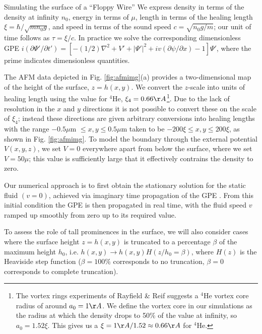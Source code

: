 \begin{chapter}{\label{cha:afm}Simulating the surface of a ``Floppy Wire''}
We express density in terms of the density at infinity $n_0$, energy in terms of $\mu$, length in terms of the healing length $\xi=\hbar/\sqrt{m n_0 g}$, and speed in terms of the sound speed $c=\sqrt{n_0 g/m}$; our unit of time follows as $\tau=\xi/c$.  In practice we solve the corresponding dimensionless GPE $i(\partial\Psi'/\partial t') = \left[-(1/2)\nabla^2 + V' + |\Psi'|^2 + iv (\partial \psi/\partial x)- 1 \right] \Psi'$, where the prime indicates dimensionless quantities.

The AFM data depicted in Fig. \ref{fig:afmimg}(a) provides a two-dimensional map of the height of the surface, $z=h(x,y)$.  We convert the $z$-scale into units of healing length using the value for $^{4}$He, $\xi_{4}=0.66 \AA$\footnote{The vortex rings experiments of Rayfield \& Reif \cite{Rayfield1964} 
suggests a $^4$He vortex core radius of around $a_0=1\AA$. We define the vortex 
core in our simulations as the radius at which the density drops to 
50\% of the value at infinity, so $a_0 = 1.52\xi$. This gives us a
$\xi=1\AA/1.52 \approx 0.66\AA$ for $^4$He.}.  Due to the lack of resolution in the $x$ and $y$ directions it is not possible to convert these on the scale of $\xi_{4}$; instead these directions are given arbitrary conversions into healing lengths with the range $-0.5 \mu$m $\leq x,y \leq 0.5 \mu$m taken to be $-200 \xi \leq x,y \leq 200 \xi$, as shown in Fig. \ref{fig:afmimg}.
To model the boundary through the external potential $V(x,y,z)$, we set $V=0$ everywhere apart from below the surface, where we set $V=50 \mu$; this value is sufficiently large that it effectively contrains the density to zero.  

Our numerical approach is to first obtain the stationary solution for the static fluid $(v=0)$, achieved via imaginary time propagation of the GPE \cite{Minguzzi2004}.  From this initial condition the GPE is then propagated in real time, with the fluid speed $v$ ramped up smoothly from zero up to its required value.  

To assess the role of tall prominences in the surface, we will also consider cases where the surface height $z=h(x,y)$ is truncated to a percentage $\beta$ of the maximum height $h_0$, i.e. $h(x,y) \rightarrow h(x,y) H(z/h_0=\beta)$, where $H(z)$ is the Heaviside step function ($\beta=100\%$ corresponds to no truncation, $\beta=0$ corresponds to complete truncation).



\end{chapter}
